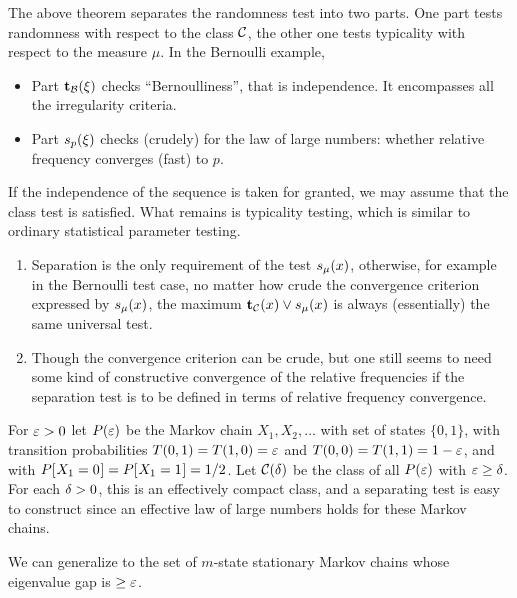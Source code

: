 The above theorem separates the randomness test into two parts.
One part tests randomness with respect to the class \( \mathcal{C} \), the other one tests
typicality with respect to the measure \( \mu \).
In the Bernoulli example,
 \begin{itemize}
  \item Part \( \mathbf{t}_{\mathcal{B}}(\xi) \) checks ``Bernoulliness'', that is independence.
It encompasses all the irregularity criteria.
  \item Part \( s_{p}(\xi) \) checks
(crudely) for the law of large numbers: whether relative frequency converges
(fast) to \( p \).
 \end{itemize}
If the independence of the sequence is taken for granted, we may assume that
the class test is satisfied.
What remains is typicality testing, which is similar to 
ordinary statistical parameter testing.

 \begin{remarks}
  \label{rem:g4.2.8}
   \begin{enumerate}
   \item 
Separation is the only requirement of the test \( s_{\mu}(x) \),
otherwise, for example in the Bernoulli test case,
no matter how crude the convergence criterion expressed by
\( s_{\mu}(x) \), the maximum \( \mathbf{t}_{\mathcal{C}}(x)\lor s_{\mu}(x) \) 
is always (essentially) the same universal test.
  \item
Though the convergence criterion can be crude, but one still seems to need some
kind of constructive convergence of the relative frequencies if the separation
test is to be defined in terms of relative frequency convergence.
   \end{enumerate}
 \end{remarks}

 \begin{example}
  \label{ex:g4.2.9}
For \( \varepsilon>0 \) let \( P(\varepsilon) \) be the Markov chain \( X_{1},X_{2},\dots \)
with set of states \( \{0,1\} \),
with transition probabilities \( T(0,1)=T(1,0)=\varepsilon \) and \( T(0,0)=T(1,1)=1-\varepsilon \),
and with \( P\mathopen[\mskip 1mu X_{1}=0\mskip 1mu\mathclose]=P\mathopen[\mskip 1mu X_{1}=1\mskip 1mu\mathclose]=1/2 \).
Let \( \mathcal{C}(\delta) \) be the class of all \( P(\varepsilon) \) with \( \varepsilon\ge\delta \).
For each \( \delta>0 \), this is an effectively compact class, and a separating test is easy to
construct since an effective law of large numbers holds for these Markov
chains. 

We can generalize to the set of \( m \)-state stationary Markov chains whose 
eigenvalue gap is \( \ge\varepsilon \).
 \end{example}

